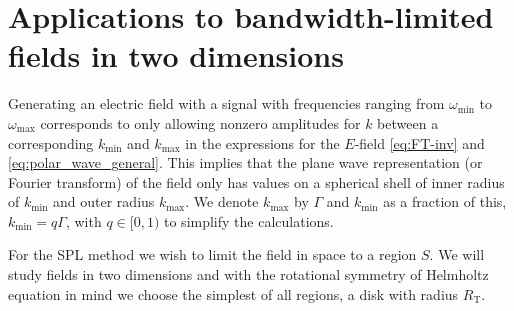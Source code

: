 \documentclass[11pt,a4paper, 
swedish,english %
]{article}
\newcommand{\RT}{\ensuremath{R_{\text{T}}}}
\begin{document}
\section{Applications to bandwidth-limited fields in two dimensions}

Generating an electric field with a signal with frequencies ranging from $\omega_{\min}$ to $\omega_{\max}$
\footnotemark corresponds to only allowing nonzero amplitudes for $k$ between a corresponding
$k_{\min}$ and $k_{\max}$ in the expressions for the $E$-field \eqref{eq:FT-inv} and \eqref{eq:polar_wave_general}.
This implies that the plane wave representation (or Fourier transform) of the field only
has values on a spherical shell of inner radius of $k_{\min}$ and outer radius $k_{\max}$.
We denote $k_{\max}$ by $\Gamma$ and $k_{\min}$ as a fraction of this, $k_{\min}=q\Gamma$, with
$q \in [0,1)$ to simplify the calculations.

For the SPL method we wish to limit the field in space to a region $S$. We will study fields in two dimensions and
with the rotational symmetry of Helmholtz equation in mind we choose the simplest of all regions, a disk with radius $\RT$.

\end{document}
